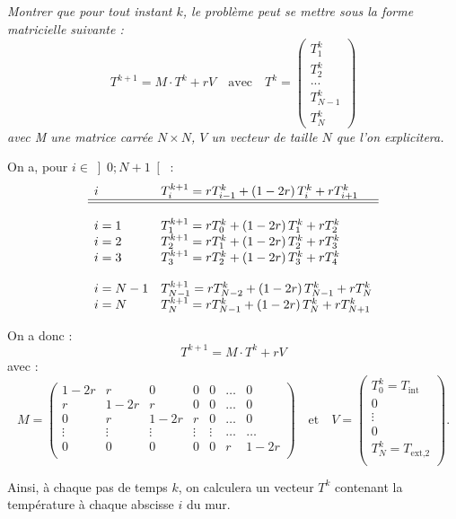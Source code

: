 \documentclass[10pt,fleqn]{article} %
\begin{document}
\begin{multicols}{2}
\subparagraph{}\textit{Montrer que pour tout instant $k$, le problème peut se mettre sous la forme matricielle suivante : }
$$
T^{k+1} = M \cdot T^k + rV \quad \text{avec} \quad T^k =
 \begin{pmatrix} T_1^k \\  T_2 ^k \\ ... \\  T_{N-1}^{k} \\ T_{N}^{k}  \end{pmatrix}
$$
\textit{avec M une matrice carrée $N\times N$, $V$ un vecteur de taille $N$ que l'on explicitera.}
\ifprof
\begin{corrige}
On a, pour $i\in \left]0;N+1 \right[$ :
$$
\begin{array}{ll}
i & T_{i}^{k+1} = r T_{i-1}^{k} + \left( 1-2r \right) T_i^k + r T_{i+1}^k \\
\hline 
\hline 
\\
i=1 & T_{1}^{k+1} = r T_{0}^{k} + \left( 1-2r \right) T_1^k + r T_{2}^k \\
i=2 & T_{2}^{k+1} = r T_{1}^{k} + \left( 1-2r \right) T_2^k + r T_{3}^k \\
i=3 & T_{3}^{k+1} = r T_{2}^{k} + \left( 1-2r \right) T_3^k + r T_{4}^k \\
&\\
i=N -1& T_{N -1}^{k+1} = r T_{N -2}^{k} + \left( 1-2r \right) T_{N -1}^k + r T_{N}^k \\
i=N & T_{N}^{k+1} = r T_{N-1}^{k} + \left( 1-2r \right) T_N^k + r T_{N+1}^k \\
\end{array}
$$ 

On a donc : 
$$
T^{k+1} = M \cdot T^k + rV
$$
avec :
$$
M = 
\begin{pmatrix}
1-2r & r     & 0 & 0 & 0 &  \ldots & 0 \\
r     & 1-2r & r & 0 & 0  & \ldots &  0 \\
0    & r & 1-2r & r & 0   & \ldots&  0 \\
\vdots & \vdots & \vdots & \vdots & \vdots & \ldots & \ldots \\
0& 0& 0& 0& 0& r & 1-2r\\
\end{pmatrix}
\quad \text{et} \quad 
V = \begin{pmatrix}
T_0^k = T_{\text{int}} \\
0 \\
\vdots \\
0 \\
T_N^k = T_{\text{ext,2}} \\
\end{pmatrix}.
$$
\end{corrige}
\else
\fi
\ifprof
\else
\vspace{.5cm}
Ainsi, à chaque pas de temps $k$, on calculera un vecteur $T^k$ contenant la température à chaque abscisse $i$ du mur.


\end{multicols}
\end{document}

